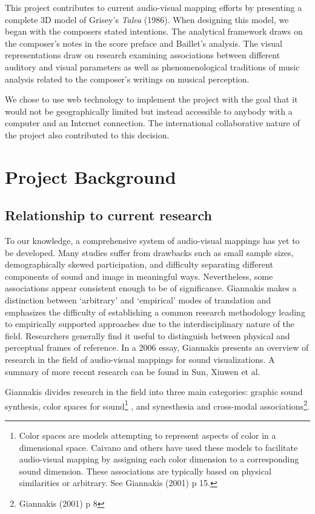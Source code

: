 \documentclass[sigconf]{nimeart}
\begin{document}
This project contributes to current audio-visual mapping efforts by presenting a complete 3D model of Grisey's \emph{Talea} (1986). When designing this model, we began with the composer\textquotesingle s stated intentions. The analytical framework draws on the composer's notes in the score preface and Baillet's analysis\cite{c6}. The visual representations draw on research examining associations between different auditory and visual parameters as well as phenomenological traditions of music analysis related to the composer's writings on musical perception\cite{c7}.

We chose to use web technology to implement the project with the goal that it would not be geographically limited but instead accessible to anybody with a computer and an Internet connection. The international collaborative nature of the project also contributed to this decision.

\section{Project Background}\label{project-background}

\subsection{Relationship to current research}\label{relationship-to-current-research}

To our knowledge, a comprehensive system of audio-visual mappings has yet to be developed. Many studies suffer from drawbacks such as small sample sizes, demographically skewed participation, and difficulty separating different components of sound and image in meaningful ways. Nevertheless, some associations appear consistent enough to be of significance. Giannakis makes a distinction between `arbitrary' and `empirical' modes of translation\cite{c8} and emphasizes the difficulty of establishing a common research methodology leading to empirically supported approaches due to the interdisciplinary nature of the field\cite{c9}. Researchers generally find it useful to distinguish between physical and perceptual frames of reference\cite{c10}. In a 2006 essay, Giannakis presents an overview of research in the field of audio-visual mappings for sound visualizations\cite{c9}. A summary of more recent research can be found in Sun, Xiuwen et al\cite{c11}.~

Giannakis divides research in the field into three main categories: graphic sound synthesis, color spaces for sound\footnote{Color spaces are models attempting to represent aspects of color in a dimensional space. Caivano and others have used these models to facilitate audio-visual mapping by assigning each color dimension to a corresponding sound dimension. These associations are typically based on physical similarities or arbitrary. See Giannakis (2001) p 15.} \cite{c12}, and synesthesia and cross-modal associations\footnote{Giannakis (2001) p 8}.
\end{document}
